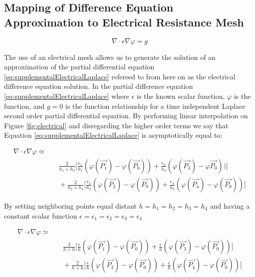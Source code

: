 \subsection{Mapping of Difference Equation Approximation to Electrical Resistance Mesh}\label{section:electricalDifferenceEquation}


\begin{equation}\label{eq:supplementalElectricalLaplace}
  \nabla \cdot \epsilon \nabla \varphi = g 
\end{equation}

The use of an electrical mesh allows us to generate the solution of an approximation of the partial differential equation \ref{eq:supplementalElectricalLaplace} refereed to from here on as the electrical difference equation solution. In the partial difference equation \ref{eq:supplementalElectricalLaplace} where $\epsilon$ is the known scalar function, $\varphi$ is the function, and $g=0$ is  the function relationship  for a time independent Laplace second order partial differential equation. By performing \gls{linear interpolation} on Figure \ref{fig:electrical} and disregarding the higher order terms we say that Equation \ref{eq:supplementalElectricalLaplace} is asymptotically equal to:

\begin{equation}\label{eq:2}
\begin{split}
  \nabla \cdot \epsilon \nabla \varphi \simeq \\
  &\quad 
  \frac{2}{h_1 + h_3} 
  \Big[ 
  	\frac{\epsilon_1}{h_1} ( \varphi(\vec{P_1}) - \varphi(\vec{P_0})) 
  +
  	\frac{\epsilon_3}{h_3} ( \varphi(\vec{P_3}) - \varphi\vec{P_0})) 
  \Big]\\
  &\quad
  + 
    \frac{2}{h_2 + h_4} 
  \Big[ 
  	\frac{\epsilon_2}{h_2} ( \varphi(\vec{P_2}) - \varphi(\vec{P_0})) 
  +
  	\frac{\epsilon_4}{h_4} ( \varphi(\vec{P_4}) - \varphi(\vec{P_0})) 
  \Big] 
\end{split}
\end{equation}

By setting neighboring points equal distant $h = h_1 = h_2 = h_3 = h_4$ and having a constant scalar function $\epsilon = \epsilon_1 = \epsilon_2 = \epsilon_3 = \epsilon_4$

\begin{equation}\label{eq:3}
\begin{split}
  \nabla \cdot \epsilon \nabla \varphi \simeq \\
  &\quad
  \frac{2}{h + h} 
  \Big[ 
  	\frac{\epsilon}{h} ( \varphi(\vec{P_1}) - \varphi(\vec{P_0})) 
  +
  	\frac{\epsilon}{h} ( \varphi(\vec{P_3}) - \varphi(\vec{P_0})) 
  \Big]\\
  &\quad
  +
  \frac{2}{h + h} 
  \Big[ 
  	\frac{\epsilon}{h} ( \varphi(\vec{P_2}) - \varphi(\vec{P_0})) 
  +
  	\frac{\epsilon}{h} ( \varphi(\vec{P_4}) - \varphi(\vec{P_0})) 
  \Big]\\
  &\quad
\end{split}
\end{equation}

